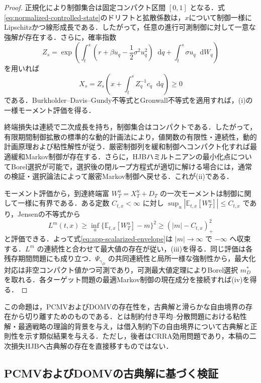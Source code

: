 \documentclass[10pt,a4paper]{article}
\theoremstyle{plain}
\theoremstyle{definition}
\newcommand{\E}{\mathbb{E}}
\newcommand{\dd}{\mathop{}\!\mathrm{d}}
\begin{document}
\begin{proof}
正規化により制御集合は固定コンパクト区間 $[0,1]$ となる．式\eqref{eq:normalized-controlled-state}のドリフトと拡散係数は，$x$について制御一様にLipschitzかつ線形成長である．したがって，任意の進行可測制御に対して一意な強解が存在する．さらに，確率指数
\[
 Z_s=\exp\!\left(
  \int_t^s\!\left(r+\beta u_q-\frac12\sigma^2u_q^2\right)\dd q
  +\int_t^s\!\sigma u_q\dd W_q
 \right)
\]
を用いれば
\begin{equation}
 X_s=Z_s\left(x+\int_t^s Z_q^{-1}c_q\dd q\right)\geq0
 \label{eq:app-state-explicit}
\end{equation}
である．Burkholder--Davis--Gundy不等式とGronwall不等式を適用すれば，(i)の一様モーメント評価を得る．

終端損失は連続で二次成長を持ち，制御集合はコンパクトである．したがって，有限期間制御拡散の標準的な動的計画法により，値関数の有限性・連続性，動的計画原理および粘性解性が従う\citep{FlemingSoner2006}．厳密制御列を緩和制御へコンパクト化すれば最適緩和Markov制御が存在する．さらに，HJBハミルトニアンの最小化点についてBorel選択が可能で，選択後の閉ループ方程式が適切に解ける場合には，通常の検証・選択論法によって厳密Markov制御へ戻せる．これが(ii)である．

モーメント評価から，到達終端富 $W_T^u=X_T^u+D_T$ の一次モーメントは制御に関して一様に有界である．ある定数 $C_{t,x}<\infty$ に対し $\sup_u|\E_{t,x}[W_T^u]|\leq C_{t,x}$ であり，Jensenの不等式から
\[
 L^m(t,x)
 \geq \inf_u\{\E_{t,x}[W_T^u]-m\}^2
 \geq (|m|-C_{t,x})_+^2
\]
と評価できる．よって式\eqref{eq:app-scalarized-envelope}は $|m|\to\infty$ で $-\infty$ へ収束する．$L^m$ の連続性と合わせて最大値の存在が従い，(iii)を得る．同じ評価は各残存期間問題にも成り立つ．$\Psi_{\gamma_D}$ の共同連続性と局所一様な強制性から，最大化対応は非空コンパクト値かつ可測であり，可測最大値定理によりBorel選択 $m_D^*$ を取れる．各ターゲット問題の最適Markov制御の現在成分を接続すれば(iv)を得る．
\end{proof}

この命題は，PCMVおよびDOMVの存在性を，古典解と滑らかな自由境界の存在から切り離すためのものである．\citet{LiZhouLim2002}と\citet{LiXu2015}は制約付き平均--分散問題における粘性解・最適戦略の理論的背景を与え，\citet{GuanLiZhouZhou2022}は借入制約下の自由境界について古典解と正則性を示す類似結果を与える．ただし，後者はCRRA効用問題であり，本稿の二次損失HJBへ古典解の存在を直接移すものではない．

\subsection{PCMVおよびDOMVの古典解に基づく検証}
\label{app:pcmv-proof}
\end{document}
